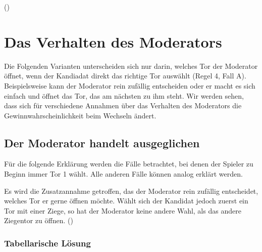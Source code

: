 (\cite{Savant:2001})

\section{Das Verhalten des Moderators}

Die Folgenden Varianten unterscheiden sich nur darin, welches Tor der Moderator öffnet, wenn der Kandiadat direkt das richtige Tor auswählt (Regel 4, Fall A). Beispielsweise kann der Moderator rein zufällig entscheiden oder er macht es sich einfach und öffnet das Tor, das am nächsten zu ihm steht. Wir werden sehen, dass sich für verschiedene Annahmen über das Verhalten des Moderators die Gewinnwahrscheinlichkeit beim Wechseln ändert.


\subsection{Der Moderator handelt ausgeglichen}

Für die folgende Erklärung werden die Fälle betrachtet, bei denen der Spieler zu Beginn immer Tor 1 wählt. Alle anderen Fälle können analog erklärt werden.

Es wird die Zusatzannahme getroffen, das der Moderator rein zufällig entscheidet, welches Tor er gerne öffnen möchte. Wählt sich der Kandidat jedoch zuerst ein Tor mit einer Ziege, so hat der Moderator keine andere Wahl, als das andere Ziegentor zu öffnen. (\cite{Krauss:2003})

\subsubsection{Tabellarische Lösung}

